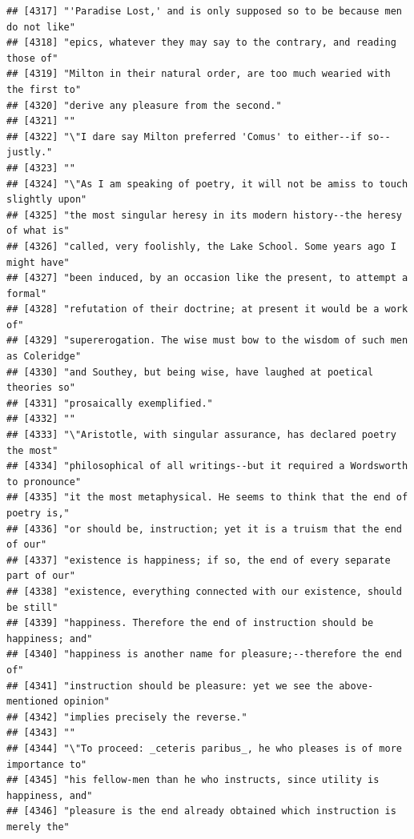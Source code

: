 \documentclass{article}\usepackage[]{graphicx}\usepackage[]{color}
\makeatletter
\newenvironment{kframe}{%
 \def\at@end@of@kframe{}%
 \ifinner\ifhmode%
  \def\at@end@of@kframe{\end{minipage}}%
  \begin{minipage}{\columnwidth}%
 \fi\fi%
 \def\FrameCommand##1{\hskip\@totalleftmargin \hskip-\fboxsep
 \colorbox{shadecolor}{##1}\hskip-\fboxsep
     \hskip-\linewidth \hskip-\@totalleftmargin \hskip\columnwidth}%
 \MakeFramed {\advance\hsize-\width
   \@totalleftmargin\z@ \linewidth\hsize
   \@setminipage}}%
 {\par\unskip\endMakeFramed%
 \at@end@of@kframe}
\newenvironment{knitrout}{}{} %
\makeatother
\begin{document}
\begin{knitrout}
\begin{kframe}
\begin{verbatim}
## [4317] "'Paradise Lost,' and is only supposed so to be because men do not like"      
## [4318] "epics, whatever they may say to the contrary, and reading those of"          
## [4319] "Milton in their natural order, are too much wearied with the first to"       
## [4320] "derive any pleasure from the second."                                        
## [4321] ""                                                                            
## [4322] "\"I dare say Milton preferred 'Comus' to either--if so--justly."             
## [4323] ""                                                                            
## [4324] "\"As I am speaking of poetry, it will not be amiss to touch slightly upon"   
## [4325] "the most singular heresy in its modern history--the heresy of what is"       
## [4326] "called, very foolishly, the Lake School. Some years ago I might have"        
## [4327] "been induced, by an occasion like the present, to attempt a formal"          
## [4328] "refutation of their doctrine; at present it would be a work of"              
## [4329] "supererogation. The wise must bow to the wisdom of such men as Coleridge"    
## [4330] "and Southey, but being wise, have laughed at poetical theories so"           
## [4331] "prosaically exemplified."                                                    
## [4332] ""                                                                            
## [4333] "\"Aristotle, with singular assurance, has declared poetry the most"          
## [4334] "philosophical of all writings--but it required a Wordsworth to pronounce"    
## [4335] "it the most metaphysical. He seems to think that the end of poetry is,"      
## [4336] "or should be, instruction; yet it is a truism that the end of our"           
## [4337] "existence is happiness; if so, the end of every separate part of our"        
## [4338] "existence, everything connected with our existence, should be still"         
## [4339] "happiness. Therefore the end of instruction should be happiness; and"        
## [4340] "happiness is another name for pleasure;--therefore the end of"               
## [4341] "instruction should be pleasure: yet we see the above-mentioned opinion"      
## [4342] "implies precisely the reverse."                                              
## [4343] ""                                                                            
## [4344] "\"To proceed: _ceteris paribus_, he who pleases is of more importance to"    
## [4345] "his fellow-men than he who instructs, since utility is happiness, and"       
## [4346] "pleasure is the end already obtained which instruction is merely the"        

\end{verbatim}
\end{kframe}
\end{knitrout}
\end{document}

